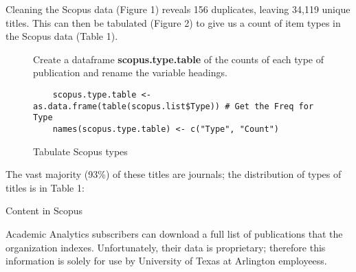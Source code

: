 \documentclass{article}
\begin{document}
Cleaning the Scopus data (Figure 1) reveals 156 duplicates, leaving 34,119 unique titles. 
This can then be tabulated (Figure 2) to give us a count of item types in the Scopus data (Table 1).
\begin{figure}[htp]
	\centering
	\caption{Tabulate Scopus types}
	\footnotesize{
		Create a dataframe \textbf{scopus.type.table} of the counts of each type of publication and rename the variable headings.
			}\begin{lstlisting}
	scopus.type.table <- as.data.frame(table(scopus.list$Type)) # Get the Freq for Type
	names(scopus.type.table) <- c("Type", "Count")
	\end{lstlisting}	
\end{figure}

The vast majority (93\%) of these titles are journals; the distribution of types of titles is in Table 1:
\begin{table}[htpb]
	\centering
	\caption{Content in Scopus}
\end{table}

Academic Analytics subscribers can download a full list of publications that the organization indexes. 
Unfortunately, their data is proprietary; therefore this information is solely for use by University of Texas at Arlington employeess. 
\end{document}
